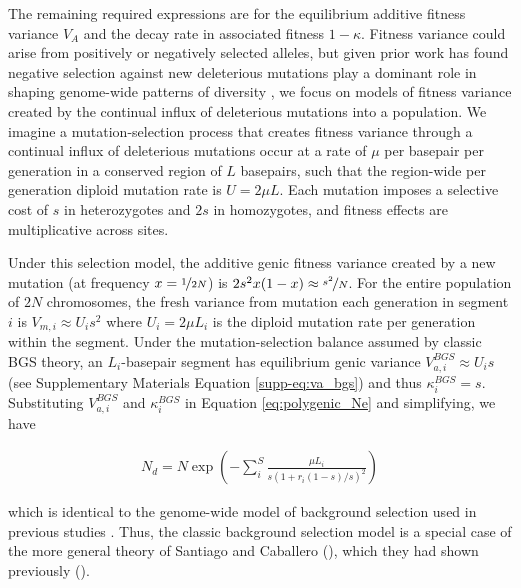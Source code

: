 \documentclass[11pt]{article}
\begin{document}
The remaining required expressions are for the equilibrium additive fitness
variance $V_A$ and the decay rate in associated fitness $1-\kappa$. Fitness
variance could arise from positively or negatively selected alleles, but given
prior work has found negative selection against new deleterious mutations play
a dominant role in shaping genome-wide patterns of diversity
\parencite{McVicker2009-ax,Murphy2022-sj}, we focus on models of fitness
variance created by the continual influx of deleterious mutations into a
population. We imagine a mutation-selection process that creates fitness
variance through a continual influx of deleterious mutations occur at a rate of
$\mu$ per basepair per generation in a conserved region of $L$ basepairs, such
that the region-wide per generation diploid mutation rate is $U = 2 \mu L$.
Each mutation imposes a selective cost of $s$ in heterozygotes and $2s$ in
homozygotes, and fitness effects are multiplicative across sites. 

Under this selection model, the additive genic fitness variance created by a
new mutation (at frequency $x=\nicefrac{1}{2N}$) is $2s^2 x(1-x) \approx
\nicefrac{s^2}{N}$. For the entire population of $2N$ chromosomes, the fresh
variance from mutation each generation in segment $i$ is $V_{m,i} \approx
U_is^2$ where $U_i = 2\mu L_i$ is the diploid mutation rate per generation
within the segment. Under the mutation-selection balance assumed by classic BGS
theory, an $L_i$-basepair segment has equilibrium genic variance $V_{a,i}^{BGS}
\approx U_i s$ (see Supplementary Materials Equation \ref{supp-eq:va_bgs}) and
thus $\kappa_i^{BGS} = s$. Substituting $V_{a,i}^{BGS}$ and $\kappa_i^{BGS}$ in
Equation \eqref{eq:polygenic_Ne} and simplifying, we have

\begin{align}
    N_d = N \exp \left( - \sum_i^S \frac{\mu L_i}{s(1 + r_i(1-s)/s)^2} \right) 
\end{align}

which is identical to the genome-wide model of background selection used in
previous studies \parencite{McVicker2009-ax,Elyashiv2016-vt,Murphy2022-sj}.
Thus, the classic background selection model is a special case of the more
general theory of Santiago and Caballero (\citeyear{Santiago2016-mu}), which
they had shown previously (\citeyear{Santiago1998-bs}).
\end{document}

